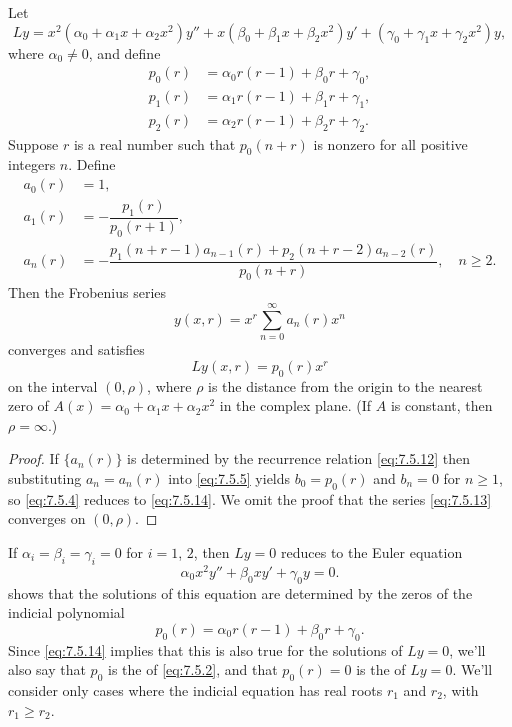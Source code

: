 \begin{theorem}\label{thmtype:7.5.2}
Let
\[
Ly=
x^2(\alpha_0+\alpha_1x+\alpha_2x^2)y''+x(\beta_0+\beta_1x+\beta_2x^2)y'
+(\gamma_0+\gamma_1x+\gamma_2x^2)y,
\]
where $\alpha_0\ne0$, and define
\begin{align*}
p_0(r)&=\alpha_0r(r-1)+\beta_0r+\gamma_0,\\
p_1(r)&=\alpha_1r(r-1)+\beta_1r+\gamma_1,\\
p_2(r)&=\alpha_2r(r-1)+\beta_2r+\gamma_2.
\end{align*}
 Suppose $r$ is a real number such that $p_0(n+r)$ is nonzero
for all positive integers $n$. Define
\begin{equation} \label{eq:7.5.12}
\begin{aligned}
a_0(r)&=1,\\
a_1(r)&=-\dfrac{p_1(r)}{p_0(r+1)},\\
a_n(r)&=-\dfrac{p_1(n+r-1)a_{n-1}(r)+p_2(n+r-2)a_{n-2}(r)}{p_0(n+r)},\quad n\ge2.
\end{aligned}
\end{equation}
Then the Frobenius series
\begin{equation} \label{eq:7.5.13}
y(x,r)=x^r\sum_{n=0}^\infty a_n(r)x^n
\end{equation}
converges and satisfies
\begin{equation} \label{eq:7.5.14}
Ly(x,r)=p_0(r)x^r
\end{equation}
on the interval $(0,\rho)$, where
 $\rho$ is the distance from the origin to the
nearest zero of $A(x)=\alpha_0+\alpha_1 x+\alpha_2 x^2$ in the complex
plane.
(If $A$ is constant, then $\rho=\infty$.)
\end{theorem}

\begin{proof}
If $\{a_n(r)\}$ is determined by the recurrence
relation
\eqref{eq:7.5.12} then substituting $a_n=a_n(r)$ into \eqref{eq:7.5.5}
yields
$b_0=p_0(r)$ and $b_n=0$ for $n\ge1$, so \eqref{eq:7.5.4} reduces to
\eqref{eq:7.5.14}. We omit the proof that the series \eqref{eq:7.5.13}
converges on  $(0,\rho)$.
\end{proof}

If $\alpha_i=\beta_i=\gamma_i=0$ for $i=1$, $2$, then $Ly=0$ reduces to
the Euler equation
\[
\alpha_0x^2y''+\beta_0xy'+\gamma_0y=0.
\]
 shows that the solutions of this equation are
determined by the zeros of the indicial polynomial
\[
p_0(r)=\alpha_0r(r-1)+\beta_0r+\gamma_0.
\]
Since \eqref{eq:7.5.14} implies that this is also true for the solutions
of $Ly=0$, we'll also say that $p_0$ is the  of \eqref{eq:7.5.2}, and that $p_0(r)=0$ is the 
 of $Ly=0$. We'll consider only cases where the
indicial equation has real roots $r_1$ and $r_2$, with $r_1\ge r_2$.

